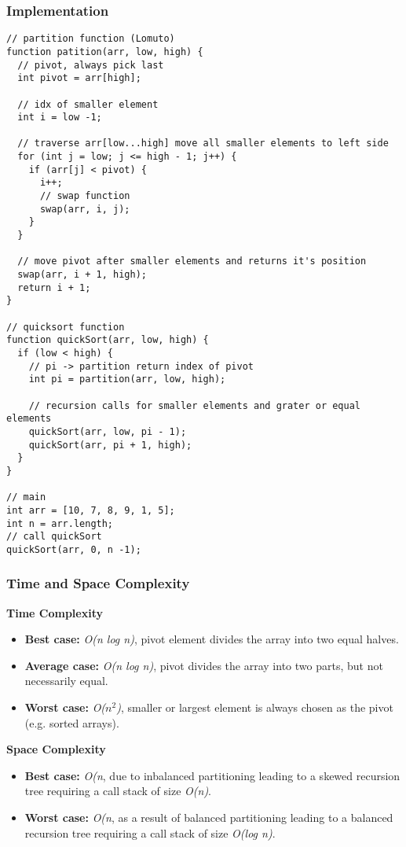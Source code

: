 \subsubsection*{Implementation}

\begin{lstlisting}[style=general]
// partition function (Lomuto)
function patition(arr, low, high) {
  // pivot, always pick last
  int pivot = arr[high];

  // idx of smaller element
  int i = low -1;

  // traverse arr[low...high] move all smaller elements to left side
  for (int j = low; j <= high - 1; j++) {
    if (arr[j] < pivot) {
      i++;
      // swap function
      swap(arr, i, j);
    }
  }

  // move pivot after smaller elements and returns it's position
  swap(arr, i + 1, high);
  return i + 1;
}

// quicksort function
function quickSort(arr, low, high) {
  if (low < high) {
    // pi -> partition return index of pivot
    int pi = partition(arr, low, high);

    // recursion calls for smaller elements and grater or equal elements
    quickSort(arr, low, pi - 1);
    quickSort(arr, pi + 1, high);
  }
}

// main
int arr = [10, 7, 8, 9, 1, 5];
int n = arr.length;
// call quickSort
quickSort(arr, 0, n -1);
\end{lstlisting}

\subsubsection*{Time and Space Complexity}

\textbf{Time Complexity}

\begin{itemize}
  \item \textbf{Best case:} \textit{O(n log n)}, pivot element divides the array into two equal halves.
  \item \textbf{Average case:} \emph{O(n log n)}, pivot divides the array into two parts, but not necessarily equal.
  \item \textbf{Worst case:} \textit{O($n^2$)}, smaller or largest element is always chosen as the pivot (e.g. sorted arrays).
\end{itemize}

\textbf{Space Complexity}

\begin{itemize}
  \item \textbf{Best case:} \textit{O(n}, due to inbalanced partitioning leading to a skewed recursion tree requiring a call stack of size \textit{O(n)}.
  \item \textbf{Worst case:} \textit{O(n}, as a result of balanced partitioning leading to a balanced recursion tree requiring a call stack of size \textit{O(log n)}.
\end{itemize}

